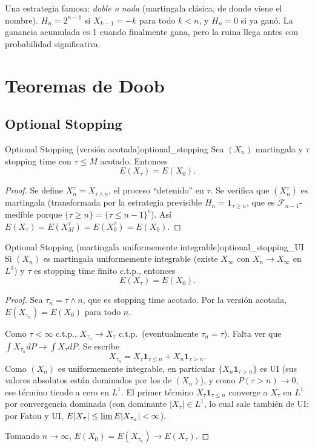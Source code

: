\documentclass[11pt, a4paper]{article}
\begin{document}
\obs Una estrategia famosa: \emph{doble o nada} (martingala clásica, de donde viene el nombre).
$H_n = 2^{n-1}$ si $X_{k-1} = -k$ para todo $k < n$, y $H_n = 0$ si ya ganó. La ganancia
acumulada es 1 cuando finalmente gana, pero la ruina llega antes con probabilidad significativa.

\newpage

\section{Teoremas de Doob}

\subsection{Optional Stopping}

\begin{teorema}{Optional Stopping (versión acotada)}{optional_stopping}
Sea $(X_n)$ martingala y $\tau$ stopping time con $\tau \le M$ acotado. Entonces
$$ E(X_\tau) = E(X_0). $$
\end{teorema}

\begin{proof}
Se define $X_n^\tau = X_{\tau \wedge n}$, el proceso ``detenido'' en $\tau$. Se verifica que
$(X_n^\tau)$ es martingala (transformada por la estrategia previsible
$H_n = \mathbf{1}_{\tau \ge n}$,
que es $\widetilde{\mathcal{F}}_{n-1}$-medible porque $\{\tau \ge n\} = \{\tau \le n-1\}^c$).
Así $E(X_\tau) = E(X_M^\tau) = E(X_0^\tau) = E(X_0)$.
\end{proof}

\begin{teorema}{Optional Stopping (martingala uniformemente integrable)}{optional_stopping_UI}
Si $(X_n)$ es martingala uniformemente integrable (existe $X_\infty$ con $X_n \to X_\infty$ en
$L^1$) y $\tau$ es stopping time finito c.t.p., entonces
$$ E(X_\tau) = E(X_0). $$
\end{teorema}

\begin{proof}
Sea $\tau_n = \tau \wedge n$, que es stopping time acotado. Por la versión acotada,
$E(X_{\tau_n}) = E(X_0)$ para todo $n$.

Como $\tau < \infty$ c.t.p., $X_{\tau_n} \to X_\tau$ c.t.p.\ (eventualmente $\tau_n = \tau$). Falta
ver que $\int X_{\tau_n} dP \to \int X_\tau dP$. Se escribe
$$ X_{\tau_n} = X_\tau \mathbf{1}_{\tau \le n} + X_n \mathbf{1}_{\tau > n}. $$
Como $(X_n)$ es uniformemente integrable, en particular $\{X_n \mathbf{1}_{\tau > n}\}$ es UI (sus
valores absolutos están dominados por los de $(X_n)$), y como $P(\tau > n) \to 0$, ese término
tiende a cero en $L^1$. El primer término $X_\tau \mathbf{1}_{\tau \le n}$ converge a $X_\tau$ en
$L^1$ por convergencia dominada (con dominante $|X_\tau| \in L^1$, lo cual sale también de UI:
por Fatou y UI, $E|X_\tau| \le \varliminf E|X_{\tau_n}| < \infty$).

Tomando $n \to \infty$, $E(X_0) = E(X_{\tau_n}) \to E(X_\tau)$.
\end{proof}
\end{document}
